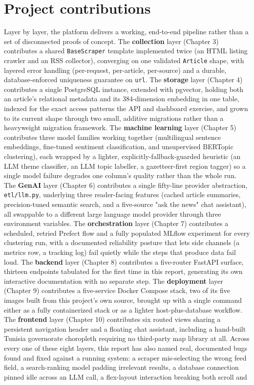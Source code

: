 \section{Project contributions}
\label{sec:contributions}
\begin{sloppypar}
Layer by layer, the platform delivers a working, end-to-end pipeline rather than a set of disconnected proofs of concept. The \textbf{collection} layer (Chapter 3) contributes a shared \texttt{BaseScraper} template implemented twice (an HTML listing crawler and an RSS collector), converging on one validated \texttt{Article} shape, with layered error handling (per-request, per-article, per-source) and a durable, database-enforced uniqueness guarantee on \texttt{url}. The \textbf{storage} layer (Chapter 4) contributes a single PostgreSQL instance, extended with pgvector, holding both an article's relational metadata and its 384-dimension embedding in one table, indexed for the exact access patterns the API and dashboard exercise, and grown to its current shape through two small, additive migrations rather than a heavyweight migration framework. The \textbf{machine learning} layer (Chapter 5) contributes three model families working together (multilingual sentence embeddings, fine-tuned sentiment classification, and unsupervised BERTopic clustering), each wrapped by a lighter, explicitly-fallback-guarded heuristic (an LLM theme classifier, an LLM topic labeller, a gazetteer-first region tagger) so a single model failure degrades one column's quality rather than the whole run. The \textbf{GenAI} layer (Chapter 6) contributes a single fifty-line provider abstraction, \texttt{etl/llm.py}, underlying three reader-facing features (cached article summaries, precision-tuned semantic search, and a five-source "ask the news" chat assistant), all swappable to a different large language model provider through three environment variables. The \textbf{orchestration} layer (Chapter 7) contributes a scheduled, retried Prefect flow and a fully populated MLflow experiment for every clustering run, with a documented reliability posture that lets side channels (a metrics row, a tracking log) fail quietly while the steps that produce data fail loud. The \textbf{backend} layer (Chapter 8) contributes a five-router FastAPI surface, thirteen endpoints tabulated for the first time in this report, generating its own interactive documentation with no separate step. The \textbf{deployment} layer (Chapter 9) contributes a five-service Docker Compose stack, two of its five images built from this project's own source, brought up with a single command either as a fully containerized stack or as a lighter host-plus-database workflow. The \textbf{frontend} layer (Chapter 10) contributes six routed views sharing a persistent navigation header and a floating chat assistant, including a hand-built Tunisia governorate choropleth requiring no third-party map library at all. Across every one of these eight layers, this report has also named real, documented bugs found and fixed against a running system: a scraper mis-selecting the wrong feed field, a search-ranking model padding irrelevant results, a database connection pinned idle across an LLM call, a flex-layout interaction breaking both scroll and 
\end{sloppypar}
